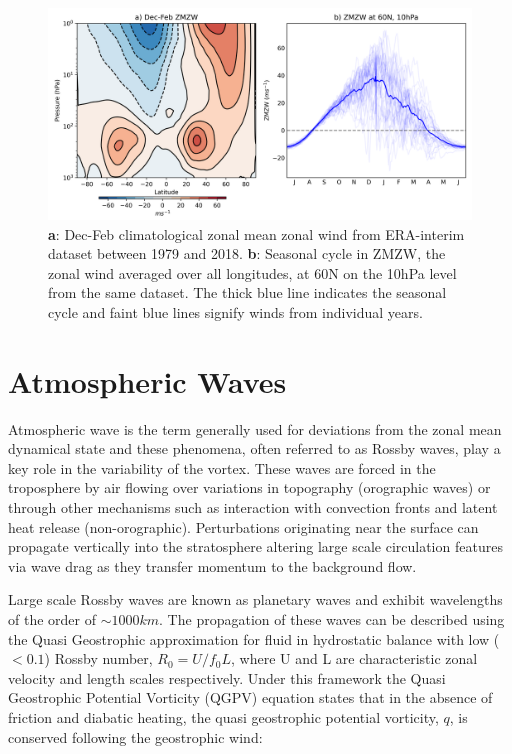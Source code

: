 \begin{figure}[h!]
\centering
    \includegraphics[width= \linewidth]{Figures/Figures-background/ZMZW_clim_cycle_ERA.png}
    \caption{\textbf{a}: Dec-Feb climatological zonal mean zonal wind from ERA-interim dataset between 1979 and 2018. \textbf{b}: Seasonal cycle in ZMZW, the zonal wind averaged over all longitudes, at 60N on the 10hPa level from the same dataset. The thick blue line indicates the seasonal cycle and faint blue lines signify winds from individual years.}
    \label{fig:ERAclimDJF}
\centering
\end{figure}

\section{Atmospheric Waves}
\label{sec:atmos_waves}
Atmospheric wave is the term generally used for deviations from the zonal mean dynamical state and these phenomena, often referred to as Rossby waves, play a key role in the variability of the vortex. These waves are forced in the troposphere by air flowing over variations in topography (orographic waves) or through other mechanisms such as interaction with convection fronts and latent heat release (non-orographic). Perturbations originating near the surface can propagate vertically into the stratosphere altering large scale circulation features via wave drag as they transfer momentum to the background flow. 

Large scale Rossby waves are known as planetary waves and exhibit wavelengths of the order of $\sim 1000km$. The propagation of these waves can be described using the Quasi Geostrophic approximation for fluid in hydrostatic balance with low ($<0.1$) Rossby number, $R_0 = U/f_0 L$, where U and L are characteristic zonal velocity and length scales respectively. Under this framework the Quasi Geostrophic Potential Vorticity (QGPV) equation states that in the absence of friction and diabatic heating, the quasi geostrophic potential vorticity, $q$, is conserved following the geostrophic wind:

